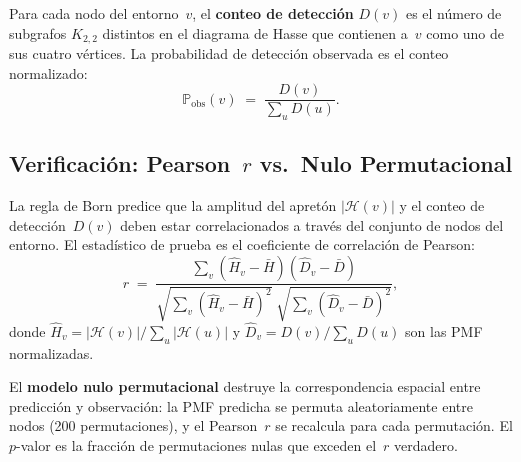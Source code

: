 \documentclass[11pt, a4paper, openany]{book}
\begin{document}
\begin{definition}
\label{def:k22-detection}
Para cada nodo del entorno~$v$, el \textbf{conteo de detecci\'on}
$D(v)$ es el n\'umero de subgrafos $K_{2,2}$ distintos en el diagrama
de Hasse que contienen a~$v$ como uno de sus cuatro v\'ertices. La
probabilidad de detecci\'on observada es el conteo normalizado:
\[
  \mathbb{P}_{\mathrm{obs}}(v) \;=\;
  \frac{D(v)}{\sum_{u} D(u)}.
\]
\end{definition}

\subsection{Verificaci\'on: Pearson~$r$ vs.\ Nulo Permutacional}

La regla de Born predice que la amplitud del apret\'on
$|\mathcal{H}(v)|$ y el conteo de detecci\'on~$D(v)$ deben estar
correlacionados a trav\'es del conjunto de nodos del entorno. El
estad\'istico de prueba es el coeficiente de correlaci\'on de Pearson:
\[
  r \;=\;
  \frac{\sum_v (\hat{H}_v - \bar{H})(\hat{D}_v - \bar{D})}
       {\sqrt{\sum_v (\hat{H}_v - \bar{H})^2}
        \;\sqrt{\sum_v (\hat{D}_v - \bar{D})^2}},
\]
donde $\hat{H}_v = |\mathcal{H}(v)| / \sum_u |\mathcal{H}(u)|$
y $\hat{D}_v = D(v) / \sum_u D(u)$ son las PMF normalizadas.

El \textbf{modelo nulo permutacional} destruye la correspondencia
espacial entre predicci\'on y observaci\'on: la PMF predicha se
permuta aleatoriamente entre nodos (200 permutaciones), y el
Pearson~$r$ se recalcula para cada permutaci\'on. El $p$-valor es la
fracci\'on de permutaciones nulas que exceden el~$r$ verdadero.
\end{document}
